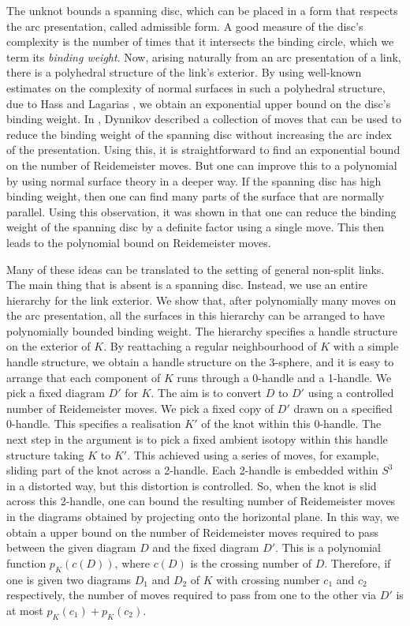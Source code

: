 \documentclass[oneside]{amsart}
\numberwithin{equation}{section}
\theoremstyle{plain}
\theoremstyle{definition}
\begin{document}
The unknot bounds a spanning disc, which can be placed in a form that respects the arc presentation,
called admissible form. A good measure of the disc's complexity is the number of times that it intersects
the binding circle, which we term its \emph{binding weight}. Now, arising naturally from an arc presentation of a link, 
there is a polyhedral structure
of the link's exterior. By using well-known estimates on the complexity of normal surfaces in such a polyhedral structure, due to
Hass and Lagarias \cite{HassLagarias}, we obtain an exponential upper bound on the disc's binding weight. In \cite{Dynnikov},
Dynnikov described a collection of moves that can be used to reduce the binding weight
of the spanning disc without increasing the arc index of the presentation. Using this,
it is straightforward to find an exponential bound on the number of Reidemeister moves.
But one can improve this to a polynomial by using normal surface theory in a deeper way.
If the spanning disc has high binding weight, then one can find many parts of the surface
that are normally parallel. Using this observation, it was shown in \cite{Lackenby:PolyUnknot} that one can reduce
the binding weight of the spanning disc by a definite factor using a single move.
This then leads to the polynomial bound on Reidemeister moves.

Many of these ideas can be translated to the setting of general non-split links. The main thing that
is absent is a spanning disc. Instead, we use an entire hierarchy for the link exterior.
We show that, after polynomially many moves on the arc presentation, all the surfaces
in this hierarchy can be arranged to have polynomially bounded binding weight. The hierarchy
specifies a handle structure on the exterior of $K$. By reattaching a regular neighbourhood
of $K$ with a simple handle structure, we obtain a handle structure on the 3-sphere,
and it is easy to arrange that each component of $K$ runs through a 0-handle and a 1-handle. 
We pick a fixed diagram $D'$ for $K$. The aim is to convert $D$ to $D'$ using a controlled
number of Reidemeister moves. We pick a fixed copy of $D'$ drawn on a specified 0-handle.
This specifies a realisation $K'$ of the knot within this 0-handle. The next step in the argument is to pick a fixed ambient isotopy
within this handle structure taking $K$ to $K'$. This achieved using a series of moves, for example,
sliding part of the knot across a 2-handle. Each 2-handle is embedded within $S^3$
in a distorted way, but this distortion is controlled. So, when the knot is slid across this 2-handle,
one can bound the resulting number of Reidemeister moves in the diagrams obtained by projecting onto the
horizontal plane. In this way, we obtain a upper bound on the number of
Reidemeister moves required to pass between the given diagram $D$ and the fixed
diagram $D'$. This is a polynomial function $p_K(c(D))$, where $c(D)$ is the crossing number
of $D$. Therefore, if one is given two diagrams $D_1$ and $D_2$ of $K$ with crossing number
$c_1$ and $c_2$ respectively, the number of moves required to pass from one to the other via $D'$
is at most $p_K(c_1) + p_K(c_2)$.
\end{document}
